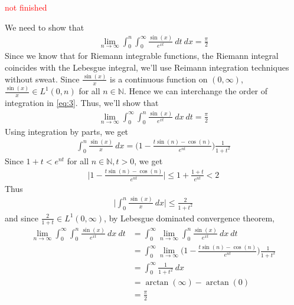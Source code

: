 \documentclass[12pt]{exam}
\theoremstyle{plain} %
\theoremstyle{definition} %
\theoremstyle{remark} %
\begin{document}
\begin{questions}
  \question
  \textcolor{red}{not finished}
  \begin{solution}
    We need to show that
    \begin{align}
      \label{eq:3}
      \lim_{ n \to \infty} \int_{0}^{n} \int_{0}^{\infty}
      \frac{\sin(x)}{e^{xt}} \ dt \ dx =
      \frac{\pi}{2}
    \end{align}
    Since we know that for Riemann integrable functions, the Riemann
    integral coincides with the Lebesgue integral, we'll use Reimann
    integration techniques without sweat. Since $\frac{\sin(x)}{x}$
    is a continuous function on $(0, \infty)$, $\frac{\sin(x)}{x} \in
    L^{1}(0, n)$ for all $n \in \mathbb{N}$. Hence we can interchange
    the order of integration in \autoref{eq:3}. Thus, we'll show that
    \begin{align*}
      \lim_{ n \to \infty} \int_{0}^{\infty}\int_{0}^{n}
      \frac{\sin(x)}{e^{xt}} \ dx \ dt =
      \frac{\pi}{2}
    \end{align*}
    Using integration by parts, we get
    \begin{align*}
      \int_{0}^{n} \frac{\sin(x)}{x} \ dx = \Big(1 - \frac{t\sin(n) -
      \cos(n)}{e^{nt}}\Big) \frac{1}{1 + t^2}
    \end{align*}
    Since $1 + t < e^{nt}$ for all $n \in \mathbb{N}, t > 0$, we get
    \begin{align*}
      \Big|1 - \frac{t\sin(n) - \cos(n)}{e^{nt}}\Big| \le 1 +
      \frac{1+t}{e^{nt}} < 2
    \end{align*}
    Thus
    \begin{align*}
      \Big|\int_{0}^{n} \frac{\sin(x)}{x} \ dx\Big| \le \frac{2}{1+t^2}
    \end{align*}
    and since $\frac{2}{1+t} \in L^{1}(0, \infty)$, by Lebesgue
    dominated convergence theorem,
    \begin{align*}
      \lim_{ n \to \infty} \int_{0}^{\infty}\int_{0}^{n}
      \frac{\sin(x)}{e^{xt}} \ dx \ dt &= \int_{0}^{\infty} \lim_{ n
      \to \infty} \int_{0}^{n}
      \frac{\sin(x)}{e^{xt}} \ dx \ dt \\
      &= \int_{0}^{\infty} \lim_{n \to \infty} \Big(1 -
      \frac{t\sin(n) - \cos(n)}{e^{nt}}\Big) \frac{1}{1 + t^2} \\
      &= \int_{0}^{\infty} \frac{1}{1+t^2} \ dx \\
      &= \arctan(\infty) - \arctan(0) \\
      &= \frac{\pi}{2}
    \end{align*}
  \end{solution}
\end{questions}
\printbibliography[heading=bibintoc]
\end{document}
